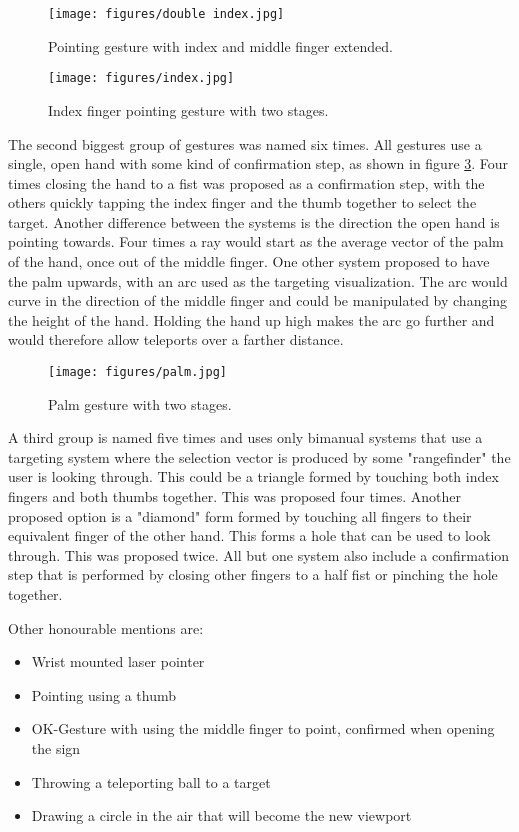 \begin{figure}[!ht]
    \centering
    \texttt{[image: figures/double index.jpg]}
    \caption{Pointing gesture with index and middle finger extended.}
    \label{fig:index2}
\end{figure}

\begin{figure}[!ht]
    \centering
    \texttt{[image: figures/index.jpg]}
    \caption{Index finger pointing gesture with two stages.}
    \label{fig:index}
\end{figure}


The second biggest group of gestures was named six times. All gestures use a single, open hand with some kind of confirmation step, as shown in figure \ref{fig:palm2}. Four times closing the hand to a fist was proposed as a confirmation step, with the others quickly tapping the index finger and the thumb together to select the target. Another difference between the systems is the direction the open hand is pointing towards. Four times a ray would start as the average vector of the palm of the hand, once out of the middle finger. One other system proposed to have the palm upwards, with an arc used as the targeting visualization. The arc would curve in the direction of the middle finger and could be manipulated by changing the height of the hand. Holding the hand up high makes the arc go further and would therefore allow teleports over a farther distance.

\begin{figure}[!ht]
    \centering
    \texttt{[image: figures/palm.jpg]}
    \caption{Palm gesture with two stages.}
    \label{fig:palm2}
\end{figure}

A third group is named five times and uses only bimanual systems that use a targeting system where the selection vector is produced by some "rangefinder" the user is looking through. This could be a triangle formed by touching both index fingers and both thumbs together. This was proposed four times. Another proposed option is a "diamond" form formed by touching all fingers to their equivalent finger of the other hand. This forms a hole that can be used to look through. This was proposed twice. All but one system also include a confirmation step that is performed by closing other fingers to a half fist or pinching the hole together.

Other honourable mentions are:
\begin{itemize}
    \item Wrist mounted laser pointer
    \item Pointing using a thumb
    \item OK-Gesture with using the middle finger to point, confirmed when opening the sign
    \item Throwing a teleporting ball to a target
    \item Drawing a circle in the air that will become the new viewport
\end{itemize}

